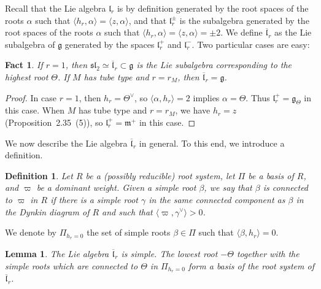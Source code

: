 \documentclass[10pt]{article}
\newtheorem{lemma}[theorem]{Lemma}
\newtheorem{fact}[theorem]{Fact}
\newtheorem{definition}[theorem]{Definition}
\theoremstyle{definition}
\numberwithin{equation}{section}
\newcommand{\jepPubCoroot}{{\scriptscriptstyle\vee}}
\begin{document}
Recall that the Lie algebra $\mathfrak l_r$ is by definition generated by the root spaces of the roots $\alpha$ such that $\langle h_r,\alpha\rangle=\langle z,\alpha\rangle$, and that $\mathfrak l_r^\pm$ is the subalgebra generated by the root spaces of the roots $\alpha$ such that $\langle h_r,\alpha\rangle=\langle z,\alpha\rangle=\pm2$. We define $\overline{\mathfrak l}_r$ as the Lie subalgebra of $\mathfrak g$ generated by the spaces $\mathfrak l_r^+$ and $\mathfrak l_r^-$. Two particular cases are easy:
\begin{fact}
If $r=1$, then $\mathfrak{sl}_2\simeq\overline{\mathfrak l}_r\subset\mathfrak g$ is the Lie subalgebra corresponding to the highest root $\Theta$. If $M$ has tube type and $r=r_M$, then $\overline{\mathfrak l}_r=\mathfrak g$.
\end{fact}
\begin{proof}
In case $r=1$, then $h_r=\Theta^\jepPubCoroot$, so $\langle\alpha,h_r\rangle=2$ implies $\alpha=\Theta$. Thus $\mathfrak l_r^+=\mathfrak g_\Theta$ in this case. When $M$ has tube type and $r=r_M$, we have $h_r=z$ (Proposition~2.35~(5)), so $\mathfrak l_r^+=\mathfrak m^+$ in this case.
\end{proof}
We now describe the Lie algebra $\overline{\mathfrak l}_r$ in general. To this end, we introduce a definition.
\begin{definition}
Let $R$ be a (possibly reducible) root system, let $\Pi$ be a basis of $R$, and $\varpi$ be a dominant weight. Given a simple root $\beta$, we say that $\beta$ is \emph{connected to $\varpi$ in $R$} if there is a simple root $\gamma$ in the same connected component as $\beta$ in the Dynkin diagram of $R$ and such that $\langle\varpi,\gamma^\jepPubCoroot\rangle>0$.
\end{definition}
We denote by $\Pi_{h_r=0}$ the set of simple roots $\beta\in\Pi$ such that $\langle\beta,h_r\rangle=0$.
\begin{lemma}
The Lie algebra $\overline{\mathfrak l}_r$ is simple. The lowest root $-\Theta$ together with the simple roots which are connected to $\Theta$ in $\Pi_{h_r=0}$ form a basis of the root system of $\overline{\mathfrak l}_r$.
\end{lemma}
\end{document}

